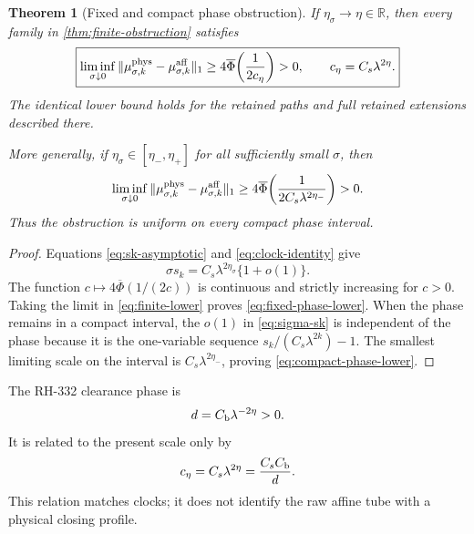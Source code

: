 \documentclass[11pt]{article}
\newtheorem{theorem}{Theorem}[section]
\theoremstyle{definition}
\theoremstyle{remark}
\newcommand{\R}{\mathbb R}
\newcommand{\Phibar}{\overline\Phi}
\begin{document}
\begin{theorem}[Fixed and compact phase obstruction]
\label{thm:phase-obstruction}
If $\eta_\sigma\to\eta\in\R$, then every family in
\cref{thm:finite-obstruction} satisfies
\begin{equation}\label{eq:fixed-phase-lower}
 \boxed{
 \liminf_{\sigma\downarrow0}
 \|\mu^{\rm phys}_{\sigma,k}
     -\mu^{\rm aff}_{\sigma,k}\|_1
 \ge
 4\Phibar\!\left(\frac1{2c_\eta}\right)>0,
 \qquad c_\eta=C_s\lambda^{2\eta}.}
\end{equation}
The identical lower bound holds for the retained paths and full retained
extensions described there.

More generally, if
$\eta_\sigma\in[\eta_-,\eta_+]$ for all sufficiently small $\sigma$, then
\begin{equation}\label{eq:compact-phase-lower}
 \liminf_{\sigma\downarrow0}
 \|\mu^{\rm phys}_{\sigma,k}
     -\mu^{\rm aff}_{\sigma,k}\|_1
 \ge
 4\Phibar\!\left(
   \frac1{2C_s\lambda^{2\eta_-}}
 \right)>0.
\end{equation}
Thus the obstruction is uniform on every compact phase interval.
\end{theorem}

\begin{proof}
Equations \eqref{eq:sk-asymptotic} and \eqref{eq:clock-identity} give
\begin{equation}\label{eq:sigma-sk}
 \sigma s_k=C_s\lambda^{2\eta_\sigma}\{1+o(1)\}.
\end{equation}
The function $c\mapsto4\Phibar(1/(2c))$ is continuous and strictly
increasing for $c>0$.  Taking the limit in \eqref{eq:finite-lower} proves
\eqref{eq:fixed-phase-lower}.  When the phase remains in a compact interval,
the $o(1)$ in \eqref{eq:sigma-sk} is independent of the phase because it is
the one-variable sequence $s_k/(C_s\lambda^{2k})-1$.  The smallest limiting
scale on the interval is $C_s\lambda^{2\eta_-}$, proving
\eqref{eq:compact-phase-lower}.
\end{proof}

The RH-332 clearance phase is
\begin{equation}\label{eq:clearance-relation}
 d=C_{\rm b}\lambda^{-2\eta}>0.
\end{equation}
It is related to the present scale only by
\begin{equation}\label{eq:c-d-relation}
 c_\eta=C_s\lambda^{2\eta}
 =\frac{C_sC_{\rm b}}d.
\end{equation}
This relation matches clocks; it does not identify the raw affine tube with a
physical closing profile.
\end{document}
